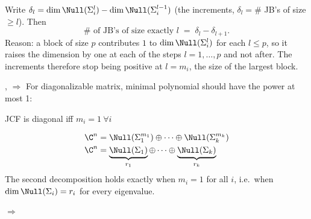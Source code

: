 \begin{insight}
Write $\delta_l=\dim\Null(\Sigma_i^l)-\dim\Null(\Sigma_i^{l-1})$ (the increments, $\delta_l=\#$ JB's of size $\ge l$). Then
\[
\#\text{ of JB's of size exactly } l \;=\; \delta_l-\delta_{l+1}.
\]
Reason: a block of size $p$ contributes $1$ to $\dim\Null(\Sigma_i^l)$ for each $l\le p$, so it raises the dimension by one at each of the steps $l=1,\dots,p$ and not after. The increments therefore stop being positive at $l=m_i$, the size of the largest block.
\end{insight}

\sep
{}
$\Rightarrow$ For diagonalizable matrix, minimal polynomial should have the power at most 1:
\begin{keybox}
\centering JCF is diagonal iff $m_i=1\ \forall i$
\end{keybox}
\begin{align*}
\C^n&=\Null(\Sigma_1^{m_1})\oplus\cdots\oplus\Null(\Sigma_k^{m_k})\\
\C^n&=\underbrace{\Null(\Sigma_1)}_{r_1}\oplus\cdots\oplus\underbrace{\Null(\Sigma_k)}_{r_k}
\end{align*}
The second decomposition holds exactly when $m_i=1$ for all $i$, i.e.\ when $\dim\Null(\Sigma_i)=r_i$ for every eigenvalue.

$\Rightarrow$ 

